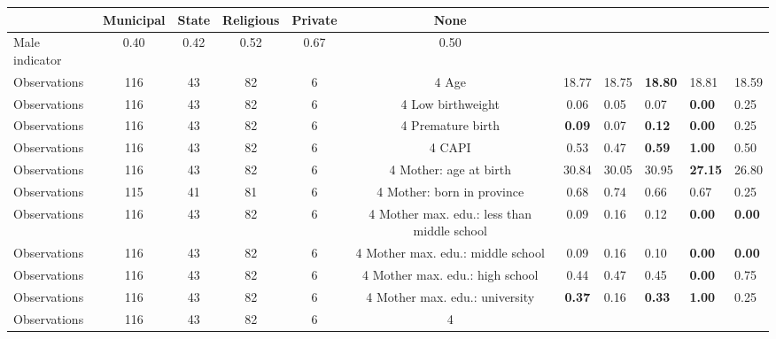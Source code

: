 \begin{tabular}{l c c c c c c }
\toprule
& \textbf{Municipal} & \textbf{State} & \textbf{Religious} & \textbf{Private} & \textbf{None} \\
\midrule
Male indicator &      0.40 &      0.42 &      0.52 &      0.67 &      0.50 \\
\midrule
Observations &       116 &        43 &        82 &         6 &         4
Age &     18.77 &     18.75 & \textbf{    18.80} &     18.81 &     18.59 \\
\midrule
Observations &       116 &        43 &        82 &         6 &         4
Low birthweight &      0.06 &      0.05 &      0.07 & \textbf{     0.00} &      0.25 \\
\midrule
Observations &       116 &        43 &        82 &         6 &         4
Premature birth & \textbf{     0.09} &      0.07 & \textbf{     0.12} & \textbf{     0.00} &      0.25 \\
\midrule
Observations &       116 &        43 &        82 &         6 &         4
CAPI &      0.53 &      0.47 & \textbf{     0.59} & \textbf{     1.00} &      0.50 \\
\midrule
Observations &       116 &        43 &        82 &         6 &         4
Mother: age at birth &     30.84 &     30.05 &     30.95 & \textbf{    27.15} &     26.80 \\
\midrule
Observations &       115 &        41 &        81 &         6 &         4
Mother: born in province &      0.68 &      0.74 &      0.66 &      0.67 &      0.25 \\
\midrule
Observations &       116 &        43 &        82 &         6 &         4
Mother max. edu.: less than middle school &      0.09 &      0.16 &      0.12 & \textbf{     0.00} & \textbf{     0.00} \\
\midrule
Observations &       116 &        43 &        82 &         6 &         4
Mother max. edu.: middle school &      0.09 &      0.16 &      0.10 & \textbf{     0.00} & \textbf{     0.00} \\
\midrule
Observations &       116 &        43 &        82 &         6 &         4
Mother max. edu.: high school &      0.44 &      0.47 &      0.45 & \textbf{     0.00} &      0.75 \\
\midrule
Observations &       116 &        43 &        82 &         6 &         4
Mother max. edu.: university & \textbf{     0.37} &      0.16 & \textbf{     0.33} & \textbf{     1.00} &      0.25 \\
\midrule
Observations &       116 &        43 &        82 &         6 &         4

\end{tabular}
